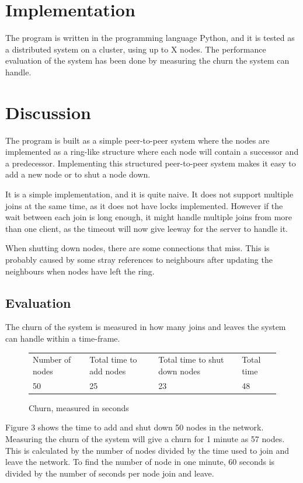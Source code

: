 \section{Implementation}
The program is written in the programming language Python, and it is tested as a distributed system on a cluster, using up to X nodes. The performance evaluation of the system has been done by measuring the churn the system can handle.


\section{Discussion}
The program is built as a simple peer-to-peer system where the nodes are implemented as a ring-like structure where each node will contain a successor and a predecessor. Implementing this structured peer-to-peer system makes it easy to add a new node or to shut a node down.

It is a simple implementation, and it is quite naive. It does not support multiple joins at the same time, as it does not have locks implemented. However if the wait between each join is long enough, it might handle multiple joins from more than one client, as the timeout will now give leeway for the server to handle it.

When shutting down nodes, there are some connections that miss. This is probably caused by some stray references to neighbours after updating the neighbours when nodes have left the ring.

\subsection{Evaluation}
The churn of the system is measured in how many joins and leaves the system can handle within a time-frame.

\begin{figure}[h]
\centering
\caption{Churn, measured in seconds}
\label{my-label}
\begin{tabular}{llll}
Number of nodes & Total time to add nodes & Total time to shut down nodes & Total time \\
50              & 25                               & 23                                     & 48                 
\end{tabular}
\end{figure}
Figure 3 shows the time to add and shut down 50 nodes in the network. Measuring the churn of the system will give a churn for 1 minute as 57 nodes. This is calculated by the number of nodes divided by the time used to join and leave the network. To find the number of node in one minute, 60 seconds is divided by the number of seconds per node join and leave.

